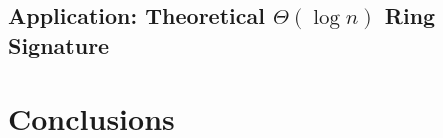         

    \section{Application: Theoretical \(\Theta(\log n)\) Ring Signature} \label{sec:log-ring-signature}
        
        

\chapter{Conclusions}

        
